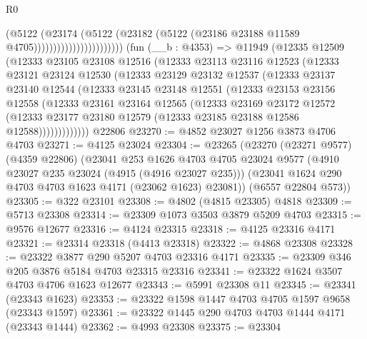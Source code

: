 \begin{lexlean}{R0}
\begin{coremodule}
                                      (@5122
                                        (@23174
                                          (@5122
                                            (@23182
                                              (@5122
                                                (@23186 @23188 @11589 @4705)))))))))))))))))))))))
    (fun (__b : @4353) =>
    @11949
      (@12335
        @12509
        (@12333
          @23105
          @23108
          @12516
          (@12333
            @23113
            @23116
            @12523
            (@12333
              @23121
              @23124
              @12530
              (@12333
                @23129
                @23132
                @12537
                (@12333
                  @23137
                  @23140
                  @12544
                  (@12333
                    @23145
                    @23148
                    @12551
                    (@12333
                      @23153
                      @23156
                      @12558
                      (@12333
                        @23161
                        @23164
                        @12565
                        (@12333
                          @23169
                          @23172
                          @12572
                          (@12333
                            @23177
                            @23180
                            @12579
                            (@12333 @23185 @23188 @12586 @12588)))))))))))))
    @22806
@23270 := @4852 @23027 @1256 @3873 @4706 @4703
@23271 := @4125 @23024
@23304 := @23265
    (@23270
      (@23271 @9577)
      (@4359 @22806)
      (@23041
        @253
        @1626
        @4703
        @4705
        @23024
        @9577
        (@4910 @23027 @235 @23024 (@4915 (@4916 @23027 @235)))
        (@23041 @1624 @290 @4703 @4703 @1623 @4171 (@23062 @1623) @23081))
      (@6557 @22804 @573))
@23305 := @322 @23101
@23308 := @4802 (@4815 @23305) @4818
@23309 := @5713 @23308
@23314 := @23309 @1073 @3503 @3879 @5209 @4703
@23315 := @9576 @12677
@23316 := @4124 @23315
@23318 := @4125 @23316 @4171
@23321 := @23314 @23318 (@4413 @23318)
@23322 := @4868 @23308
@23328 := @23322 @3877 @290 @5207 @4703 @23316 @4171
@23335 := @23309 @346 @205 @3876 @5184 @4703 @23315 @23316
@23341 := @23322 @1624 @3507 @4703 @4706 @1623 @12677
@23343 := @5991 @23308 @11
@23345 := @23341 (@23343 @1623)
@23353 := @23322 @1598 @1447 @4703 @4705 @1597 @9658 (@23343 @1597)
@23361 := @23322 @1445 @290 @4703 @4703 @1444 @4171 (@23343 @1444)
@23362 := @4993 @23308
@23375 := @23304

\end{coremodule}
\end{lexlean}
